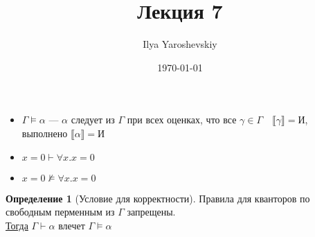 \documentclass[english]{article}
\author{Ilya Yaroshevskiy}
\date{\today}
\title{Лекция 7}
\theoremstyle{plain}
\theoremstyle{remark}
\theoremstyle{definition}
\newtheorem*{definition}{Определение}
\begin{document}
\maketitle
\tableofcontents

\begin{itemize}
\item \(\Gamma \vDash \alpha\) --- \(\alpha\) следует из \(\Gamma\) при всех оценках, что все \(\gamma \in \Gamma\quad \llbracket \gamma \rrbracket = \text{И}\), выполнено \(\llbracket \alpha \rrbracket = \text{И}\)
\item \(x = 0 \vdash \forall x. x = 0\)
\item \(x = 0 \not\vDash \forall x. x = 0\)
\end{itemize}
\begin{definition}[Условие для корректности]
Правила для кванторов по свободным перменным из \(\Gamma\) запрещены. \\
\uline{Тогда} \(\Gamma \vdash \alpha\) влечет \(\Gamma \vDash \alpha\)
\end{definition}
\end{document}
